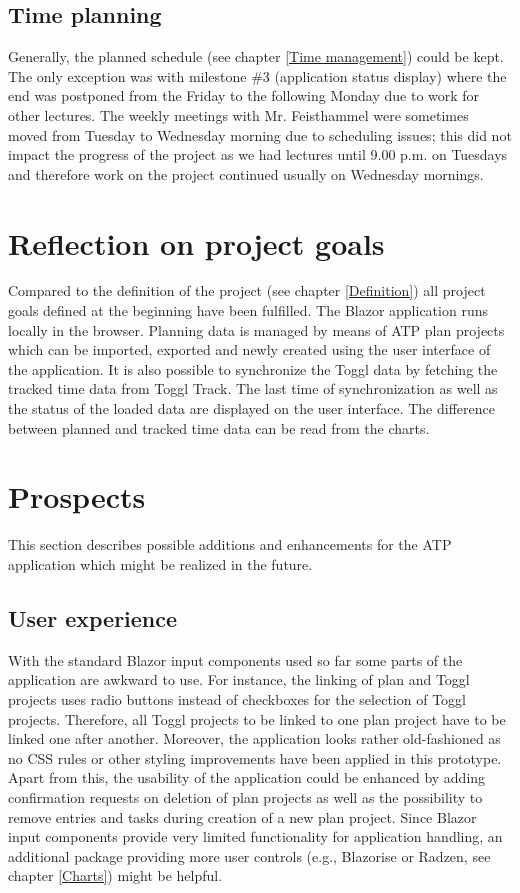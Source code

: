 \subsection{Time planning}
Generally, the planned schedule (see chapter \ref{Time management}) could be kept. The only exception was with milestone \#3 (application status display) where the end was postponed from the Friday to the following Monday due to work for other lectures. The weekly meetings with Mr. Feisthammel were sometimes moved from Tuesday to Wednesday morning due to scheduling issues; this did not impact the progress of the project as we had lectures until 9.00 p.m. on Tuesdays and therefore work on the project continued usually on Wednesday mornings.

\section{Reflection on project goals}
Compared to the definition of the project (see chapter \ref{Definition}) all project goals defined at the beginning have been fulfilled. The Blazor application runs locally in the browser. Planning data is managed by means of ATP plan projects which can be imported, exported and newly created using the user interface of the application. It is also possible to synchronize the Toggl data by fetching the tracked time data from Toggl Track. The last time of synchronization as well as the status of the loaded data are displayed on the user interface. The difference between planned and tracked time data can be read from the charts.

\section{Prospects}
This section describes possible additions and enhancements for the ATP application which might be realized in the future.

\subsection{User experience}
With the standard Blazor input components used so far some parts of the application are awkward to use. For instance, the linking of plan and Toggl projects uses radio buttons instead of checkboxes for the selection of Toggl projects. Therefore, all Toggl projects to be linked to one plan project have to be linked one after another. Moreover, the application looks rather old-fashioned as no CSS rules or other styling improvements have been applied in this prototype. Apart from this, the usability of the application could be enhanced by adding confirmation requests on deletion of plan projects as well as the possibility to remove entries and tasks during creation of a new plan project. Since Blazor input components provide very limited functionality for application handling, an additional package providing more user controls (e.g., Blazorise or Radzen, see chapter \ref{Charts}) might be helpful.

